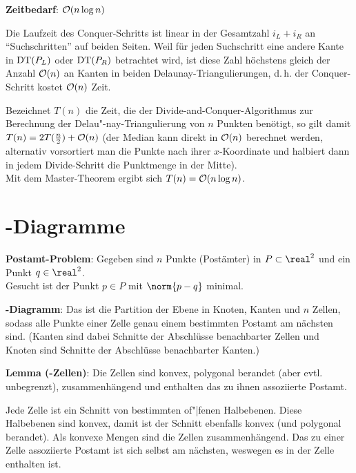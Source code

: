 \linie

\textbf{Zeitbedarf}:
$\mathcal{O}(n \log n)$

\begin{Beweis}
    Die Laufzeit des Conquer-Schritts ist linear in der Gesamtzahl $i_L + i_R$
    an "`Suchschritten"' auf beiden Seiten.
    Weil für jeden Suchschritt eine andere Kante in $\operatorname{DT}(P_L)$ oder $\operatorname{DT}(P_R)$ betrachtet wird,
    ist diese Zahl höchstens gleich der Anzahl $\mathcal{O}(n)$ an Kanten in beiden
    Delaunay-Triangulierungen,
    d.\,h. der Conquer-Schritt kostet $\mathcal{O}(n)$ Zeit.

    Bezeichnet $T(n)$ die Zeit, die der Divide-and-Conquer-Algorithmus zur Berechnung der
    Delau"-nay-Triangulierung von $n$ Punkten benötigt, so gilt damit
    $T(n) = 2T(\frac{n}{2}) + \mathcal{O}(n)$ (der Median kann direkt in $\mathcal{O}(n)$ berechnet werden,
    alternativ vorsortiert man die Punkte nach ihrer $x$-Koordinate und halbiert dann in jedem
    Divide-Schritt die Punktmenge in der Mitte).\\
    Mit dem Master-Theorem ergibt sich $T(n) = \mathcal{O}(n \log n)$.
\end{Beweis}

\pagebreak

\section{%
    -Diagramme%
}

\textbf{Postamt-Problem}:
Gegeben sind $n$ Punkte (Postämter) in $P \subset \real^2$ und ein Punkt $q \in \real^2$.\\
Gesucht ist der Punkt $p \in P$ mit $\norm{p - q}$ minimal.

\linie

\textbf{-Diagramm}:
Das  ist die Partition der Ebene
in Knoten, Kanten und $n$ Zellen,
sodass alle Punkte einer Zelle genau einem bestimmten Postamt am nächsten sind.
(Kanten sind dabei Schnitte der Abschlüsse benachbarter Zellen
und Knoten sind Schnitte der Abschlüsse benachbarter Kanten.)

\textbf{Lemma (-Zellen)}:
Die Zellen sind konvex, polygonal berandet (aber evtl. unbegrenzt),
zusammenhängend und enthalten das zu ihnen assoziierte Postamt.

\begin{Beweis}
    Jede Zelle ist ein Schnitt von bestimmten of"|fenen Halbebenen.
    Diese Halbebenen sind konvex, damit ist der Schnitt ebenfalls konvex
    (und polygonal berandet).
    Als konvexe Mengen sind die Zellen zusammenhängend.
    Das zu einer Zelle assoziierte Postamt ist sich selbst am nächsten, weswegen
    es in der Zelle enthalten ist.
\end{Beweis}

